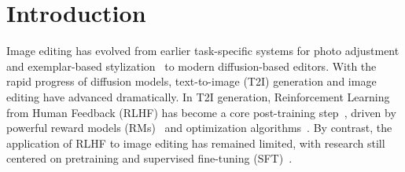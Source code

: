 


\vspace{-.8em}
\section{Introduction}
\label{sec:intro}

Image editing has evolved from earlier task-specific systems for photo adjustment and exemplar-based stylization~\cite{yan2016automatic,zhu2017exemplar} to modern diffusion-based editors. With the rapid progress of diffusion models, text-to-image (T2I) generation and image editing have advanced dramatically.
In T2I generation, Reinforcement Learning from Human Feedback (RLHF) has become a core post-training step~\citep{gong2025seedream,gao2025seedream,wu2025qwen}, driven by powerful reward models (RMs)~\citep{xu2023imagereward,ma2025hpsv3,wang2025unified} and optimization algorithms~\citep{wallace2024diffusion,xu2023imagereward,xue2025dancegrpo}. By contrast, the application of RLHF to image editing has remained limited, with research still centered on pretraining and supervised fine-tuning (SFT)~\citep{wang2025seededit,deng2025emerging,batifol2025flux}.

